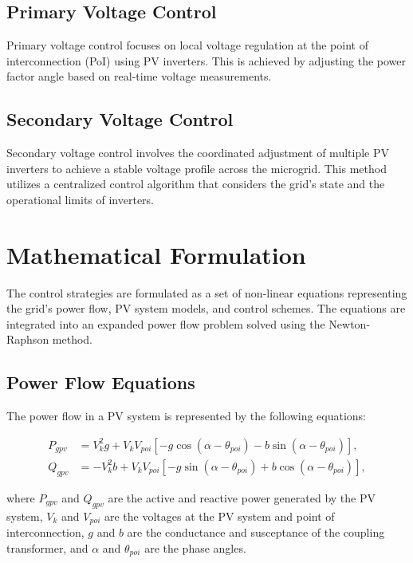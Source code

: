 \documentclass[journal]{IEEEtran}
\begin{document}
	\subsection{Primary Voltage Control}
	Primary voltage control focuses on local voltage regulation at the point of interconnection (PoI) using PV inverters. This is achieved by adjusting the power factor angle based on real-time voltage measurements.
	
	\subsection{Secondary Voltage Control}
	Secondary voltage control involves the coordinated adjustment of multiple PV inverters to achieve a stable voltage profile across the microgrid. This method utilizes a centralized control algorithm that considers the grid's state and the operational limits of inverters.
	
	\section{Mathematical Formulation}
	The control strategies are formulated as a set of non-linear equations representing the grid's power flow, PV system models, and control schemes. The equations are integrated into an expanded power flow problem solved using the Newton-Raphson method.
	
	\subsection{Power Flow Equations}
	The power flow in a PV system is represented by the following equations:
	
	\begin{equation}
		\begin{aligned}
			P_{gpv} &= V^2_k g + V_k V_{poi} \left[ -g \cos(\alpha - \theta_{poi}) - b \sin(\alpha - \theta_{poi}) \right], \\
			Q_{gpv} &= -V^2_k b + V_k V_{poi} \left[ -g \sin(\alpha - \theta_{poi}) + b \cos(\alpha - \theta_{poi}) \right],
		\end{aligned}
	\end{equation}
	
	where \(P_{gpv}\) and \(Q_{gpv}\) are the active and reactive power generated by the PV system, \(V_k\) and \(V_{poi}\) are the voltages at the PV system and point of interconnection, \(g\) and \(b\) are the conductance and susceptance of the coupling transformer, and \(\alpha\) and \(\theta_{poi}\) are the phase angles.
	
\end{document}

